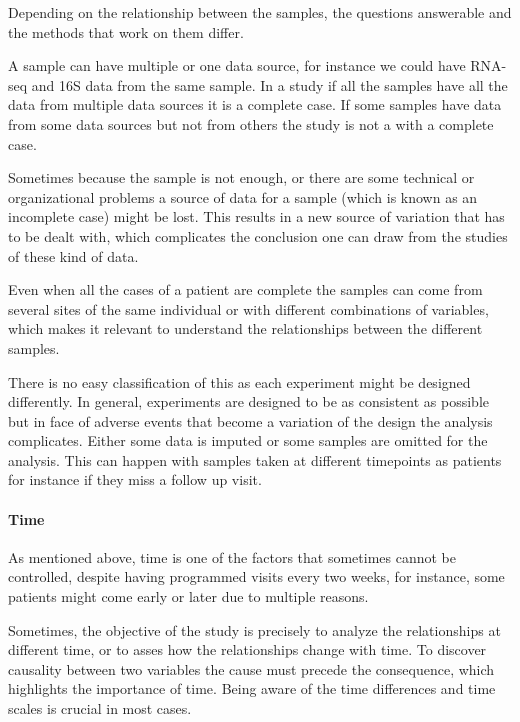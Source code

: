 \documentclass[
  a4paper,
]{book}
\begin{document}
Depending on the relationship between the samples, the questions answerable and the methods that work on them differ.

A sample can have multiple or one data source, for instance we could have RNA-seq and 16S data from the same sample.
In a study if all the samples have all the data from multiple data sources it is a complete case.
If some samples have data from some data sources but not from others the study is not a with a complete case.

Sometimes because the sample is not enough, or there are some technical or organizational problems a source of data for a sample (which is known as an incomplete case) might be lost.
This results in a new source of variation that has to be dealt with, which complicates the conclusion one can draw from the studies of these kind of data.

Even when all the cases of a patient are complete the samples can come from several sites of the same individual or with different combinations of variables, which makes it relevant to understand the relationships between the different samples.

There is no easy classification of this as each experiment might be designed differently.
In general, experiments are designed to be as consistent as possible but in face of adverse events that become a variation of the design the analysis complicates.
Either some data is imputed or some samples are omitted for the analysis.
This can happen with samples taken at different timepoints as patients for instance if they miss a follow up visit.

\hypertarget{time}{%
\paragraph*{Time}\label{time}}

As mentioned above, time is one of the factors that sometimes cannot be controlled, despite having programmed visits every two weeks, for instance, some patients might come early or later due to multiple reasons.

Sometimes, the objective of the study is precisely to analyze the relationships at different time, or to asses how the relationships change with time.
To discover causality between two variables the cause must precede the consequence, which highlights the importance of time.
Being aware of the time differences and time scales is crucial in most cases.
\end{document}
